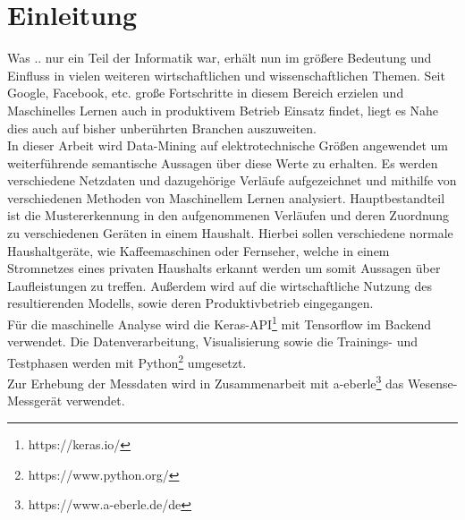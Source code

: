\chapter{Einleitung}

    Was .. nur ein Teil der Informatik war, erhält nun im größere Bedeutung und Einfluss in vielen weiteren wirtschaftlichen und wissenschaftlichen Themen. 
    Seit Google, Facebook, etc. große Fortschritte in diesem Bereich erzielen und Maschinelles Lernen auch in produktivem Betrieb Einsatz findet, liegt es Nahe dies auch auf bisher unberührten Branchen auszuweiten.\\
    \newline
    In dieser Arbeit wird Data-Mining auf elektrotechnische Größen angewendet um weiterführende semantische Aussagen über diese Werte zu erhalten. 
    Es werden verschiedene Netzdaten und dazugehörige Verläufe aufgezeichnet und mithilfe von verschiedenen Methoden von Maschinellem Lernen analysiert.
    Hauptbestandteil ist die Mustererkennung in den aufgenommenen Verläufen und deren Zuordnung zu verschiedenen Geräten in einem Haushalt. 
    Hierbei sollen verschiedene normale Haushaltgeräte, wie Kaffeemaschinen oder Fernseher, welche in einem Stromnetzes eines privaten Haushalts erkannt werden um somit Aussagen über Laufleistungen zu treffen.
    Außerdem wird auf die wirtschaftliche Nutzung des resultierenden Modells, sowie deren Produktivbetrieb eingegangen.\\
    \newline
    Für die maschinelle Analyse wird die Keras-API\footnote{https://keras.io/} mit Tensorflow im Backend verwendet.
    Die Datenverarbeitung, Visualisierung sowie die Trainings- und Testphasen werden mit Python\footnote{https://www.python.org/} umgesetzt.\\
    \newline
    Zur Erhebung der Messdaten wird in Zusammenarbeit mit a-eberle\footnote{https://www.a-eberle.de/de} das Wesense-Messgerät verwendet. 
